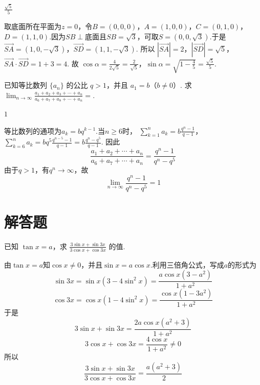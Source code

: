 \begin{answer}
\(\frac{\sqrt{5}}{5}\)
\end{answer}

\begin{solution}
取底面所在平面为\(z=0\)，令\(B=(0,0,0)\)，\(A=(1,0,0)\)，\(C=(0,1,0)\)，\(D=(1,1,0)\).因为\(SB\perp\)底面且\(SB=\sqrt3\)，可取\(S=(0,0,\sqrt3)\).于是
\(\overrightarrow{SA}=(1,0,-\sqrt3)\)，\(\overrightarrow{SD}=(1,1,-\sqrt3)\).
所以
\(|\overrightarrow{SA}|=2\)，\(|\overrightarrow{SD}|=\sqrt5\)，\(\overrightarrow{SA}\cdot\overrightarrow{SD}=1+3=4\).
故
\(\cos\alpha=\frac{4}{2\sqrt5}=\frac{2}{\sqrt5}\)，\(\sin\alpha=\sqrt{1-\frac45}=\frac{\sqrt5}{5}\).
\end{solution}

\begin{problem}

已知等比数列 \(\{a_{n}\}\) 的公比 \(q > 1\)，并且 \(a_{1} = b\)（\(b \neq 0\)）. 求 \(\displaystyle\lim_{n \to \infty} \frac{a_{1} + a_{2} + a_{3} + \cdots + a_{n}}{a_{6} + a_{7} + a_{8} + \cdots + a_{n}}=\)\fillinblank{}.
\end{problem}

\begin{answer}
\(1\)
\end{answer}

\begin{solution}
等比数列的通项为\(a_k=bq^{k-1}\).当\(n\ge6\)时，
\(\sum_{k=1}^{n}a_k=b\frac{q^n-1}{q-1}\)，\(\sum_{k=6}^{n}a_k=bq^5\frac{q^{n-5}-1}{q-1}=b\frac{q^n-q^5}{q-1}\).
因此
\[
\frac{a_1+a_2+\cdots+a_n}{a_6+a_7+\cdots+a_n}
=\frac{q^n-1}{q^n-q^5}
\]
由于\(q>1\)，有\(q^n\to\infty\)，故
\[
\lim_{n\to\infty}\frac{q^n-1}{q^n-q^5}=1
\]
\end{solution}

\section{解答题}

\begin{problem}

已知 \(\tan x = a\)，求 \(\frac{3\sin x + \sin 3x}{3\cos x + \cos 3x}\) 的值.
\end{problem}

\begin{solution}
由\(\tan x=a\)知\(\cos x\ne0\)，并且\(\sin x=a\cos x\).利用三倍角公式，写成\(a\)的形式为
\[
\sin3x=\sin x(3-4\sin^2x)
=\frac{a\cos x(3-a^2)}{1+a^2}
\]
\[
\cos3x=\cos x(1-4\sin^2x)
=\frac{\cos x(1-3a^2)}{1+a^2}
\]
于是
\[
3\sin x+\sin3x
=\frac{2a\cos x(a^2+3)}{1+a^2}
\]
\[
3\cos x+\cos3x
=\frac{4\cos x}{1+a^2}\ne0
\]
所以
\[
\frac{3\sin x+\sin3x}{3\cos x+\cos3x}
=\frac{a(a^2+3)}{2}
\]
\end{solution}

